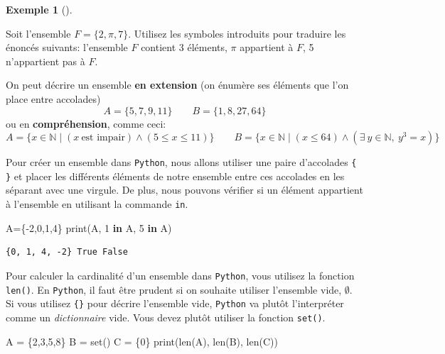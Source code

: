 \documentclass[
  letterpaper,
]{scrbook}
\newenvironment{Shaded}{}{}
\newcommand{\BuiltInTok}[1]{#1}
\newcommand{\DecValTok}[1]{\textcolor[rgb]{0.25,0.63,0.44}{#1}}
\newcommand{\KeywordTok}[1]{\textcolor[rgb]{0.00,0.44,0.13}{\textbf{#1}}}
\newcommand{\NormalTok}[1]{#1}
\newcommand{\OperatorTok}[1]{\textcolor[rgb]{0.40,0.40,0.40}{#1}}
\newcommand{\set}[1]{\{#1\}}
\theoremstyle{definition}
\newtheorem{example}{Exemple}[chapter]
\theoremstyle{definition}
\theoremstyle{plain}
\theoremstyle{remark}
\begin{document}
\leavevmode{}%
\begin{example}[]\label{exm-ensemble-simple}

Soit l'ensemble \(F=\set{2,\pi,7}\). Utilisez les symboles introduits
pour traduire les énoncés suivants: l'ensemble \(F\) contient 3
éléments, \(\pi\) appartient à \(F\), 5 n'appartient pas à \(F\).

\end{example}

On peut décrire un ensemble \textbf{en extension} (on énumère ses
éléments que l'on place entre accolades) \[
A=\set{5,7,9,11} \qquad B=\set{1,8,27,64}
\] ou en \textbf{compréhension}, comme ceci: \[
A=\set{x\in\mathbb{N}\mid (x\ \text{est impair}) \wedge (5\leq x \leq 11)} \qquad
B=\set{x\in\mathbb{N}\mid (x \leq 64) \wedge (\exists\ y\in \mathbb{N},\ y^3=x)}
\]

Pour créer un ensemble dans \texttt{Python}, nous allons utiliser une
paire d'accolades \texttt{\{} \texttt{\}} et placer les différents
éléments de notre ensemble entre ces accolades en les séparant avec une
virgule. De plus, nous pouvons vérifier si un élément appartient à
l'ensemble en utilisant la commande \texttt{in}.

\hypertarget{ensemble-accolades}{}
\begin{Shaded}
\begin{Highlighting}[]
\NormalTok{A}\OperatorTok{=}\NormalTok{\{}\OperatorTok{{-}}\DecValTok{2}\NormalTok{,}\DecValTok{0}\NormalTok{,}\DecValTok{1}\NormalTok{,}\DecValTok{4}\NormalTok{\}}
\BuiltInTok{print}\NormalTok{(A, }\DecValTok{1} \KeywordTok{in}\NormalTok{ A, }\DecValTok{5} \KeywordTok{in}\NormalTok{ A)}
\end{Highlighting}
\end{Shaded}

\begin{verbatim}
{0, 1, 4, -2} True False
\end{verbatim}

Pour calculer la cardinalité d'un ensemble dans \texttt{Python}, vous
utilisez la fonction \texttt{len()}. En \texttt{Python}, il faut être
prudent si on souhaite utiliser l'ensemble vide, \(\emptyset\). Si vous
utilisez \texttt{\{\}} pour décrire l'ensemble vide, \texttt{Python} va
plutôt l'interpréter comme un \emph{dictionnaire} vide. Vous devez
plutôt utiliser la fonction \texttt{set()}.

\hypertarget{cardinalite-python}{}
\begin{Shaded}
\begin{Highlighting}[]
\NormalTok{A }\OperatorTok{=}\NormalTok{ \{}\DecValTok{2}\NormalTok{,}\DecValTok{3}\NormalTok{,}\DecValTok{5}\NormalTok{,}\DecValTok{8}\NormalTok{\}}
\NormalTok{B }\OperatorTok{=} \BuiltInTok{set}\NormalTok{()}
\NormalTok{C }\OperatorTok{=}\NormalTok{ \{}\DecValTok{0}\NormalTok{\}}
\BuiltInTok{print}\NormalTok{(}\BuiltInTok{len}\NormalTok{(A), }\BuiltInTok{len}\NormalTok{(B), }\BuiltInTok{len}\NormalTok{(C))}
\end{Highlighting}
\end{Shaded}
\end{document}
